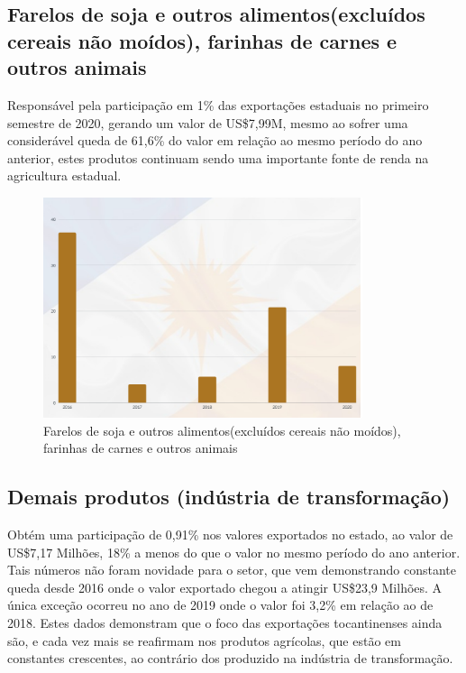 \subsection {Farelos de soja e outros alimentos(excluídos cereais não moídos), farinhas de carnes e outros animais}
Responsável pela participação em 1\% das exportações estaduais no primeiro semestre de 2020, gerando um valor de US\$7,99M, mesmo ao sofrer uma considerável queda de 61,6\% do valor em relação ao mesmo período do ano anterior, estes produtos continuam sendo uma importante fonte de renda na agricultura estadual. 

\begin{figure} [h] \caption{Farelos de soja e outros alimentos(excluídos cereais não moídos), farinhas de carnes e outros animais}
	\includegraphics[width=\linewidth]{fig/farelos1.png}
\end{figure}

\newpage

\subsection {Demais produtos (indústria de transformação)}
Obtém uma participação de 0,91\% nos valores exportados no estado, ao valor de US\$7,17 Milhões, 18\% a menos do que o valor no mesmo período do ano anterior. Tais números não foram novidade para o setor, que vem demonstrando constante queda desde 2016 onde o valor exportado chegou a atingir US\$23,9 Milhões. A única exceção ocorreu no ano de 2019 onde o valor foi 3,2\% em relação ao de 2018. Estes dados demonstram que o foco das exportações tocantinenses ainda são, e cada vez mais se reafirmam nos produtos agrícolas, que estão em constantes crescentes, ao contrário dos produzido na indústria de transformação. 

